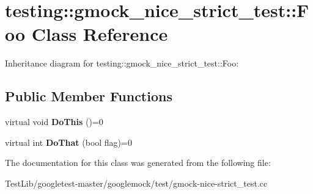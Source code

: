 \hypertarget{classtesting_1_1gmock__nice__strict__test_1_1Foo}{}\section{testing\+:\+:gmock\+\_\+nice\+\_\+strict\+\_\+test\+:\+:Foo Class Reference}
\label{classtesting_1_1gmock__nice__strict__test_1_1Foo}


Inheritance diagram for testing\+:\+:gmock\+\_\+nice\+\_\+strict\+\_\+test\+:\+:Foo\+:
\subsection*{Public Member Functions}
\begin{DoxyCompactItemize}
\item 
\mbox{\label{classtesting_1_1gmock__nice__strict__test_1_1Foo_a79a3cdbd8d9d9f6bc87580563b0d7cec}} 
virtual void {\bfseries Do\+This} ()=0
\item 
\mbox{\label{classtesting_1_1gmock__nice__strict__test_1_1Foo_a8527a459b03f333a809a3376311a9f8b}} 
virtual int {\bfseries Do\+That} (bool flag)=0
\end{DoxyCompactItemize}


The documentation for this class was generated from the following file\+:\begin{DoxyCompactItemize}
\item 
Test\+Lib/googletest-\/master/googlemock/test/gmock-\/nice-\/strict\+\_\+test.\+cc\end{DoxyCompactItemize}
